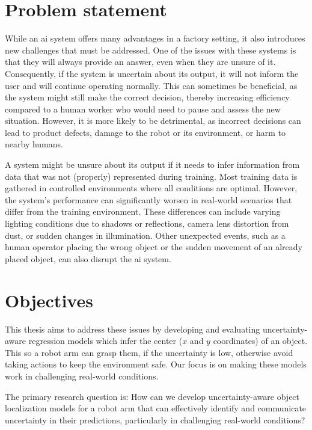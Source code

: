 \section{Problem statement} \label{ch:introduction_section:problem-statement}
While an \gls{ai} system offers many advantages in a factory setting, it also introduces new challenges that must be addressed.
One of the issues with these systems is that they will always provide an answer, even when they are unsure of it.
Consequently, if the system is uncertain about its output, it will not inform the user and will continue operating normally.
This can sometimes be beneficial, as the system might still make the correct decision, thereby increasing efficiency compared to a human worker who would need to pause and assess the new situation.
However, it is more likely to be detrimental, as incorrect decisions can lead to product defects, damage to the robot or its environment, or harm to nearby humans.

A system might be unsure about its output if it needs to infer information from data that was not (properly) represented during training.
Most training data is gathered in controlled environments where all conditions are optimal.
However, the system's performance can significantly worsen in real-world scenarios that differ from the training environment.
These differences can include varying lighting conditions due to shadows or reflections, camera lens distortion from dust, or sudden changes in illumination.
Other unexpected events, such as a human operator placing the wrong object or the sudden movement of an already placed object, can also disrupt the \gls{ai} system.

\section{Objectives} \label{ch:introduction_section:objectives}
This thesis aims to address these issues by developing and evaluating uncertainty-aware regression models which infer the center ($x$ and $y$ coordinates) of an object. 
This so a robot arm can grasp them, if the uncertainty is low, otherwise avoid taking actions to keep the environment safe. 
Our focus is on making these models work in challenging real-world conditions.

The primary research question is:
How can we develop uncertainty-aware object localization models for a robot arm that can effectively identify and communicate uncertainty in their predictions, particularly in challenging real-world conditions?

